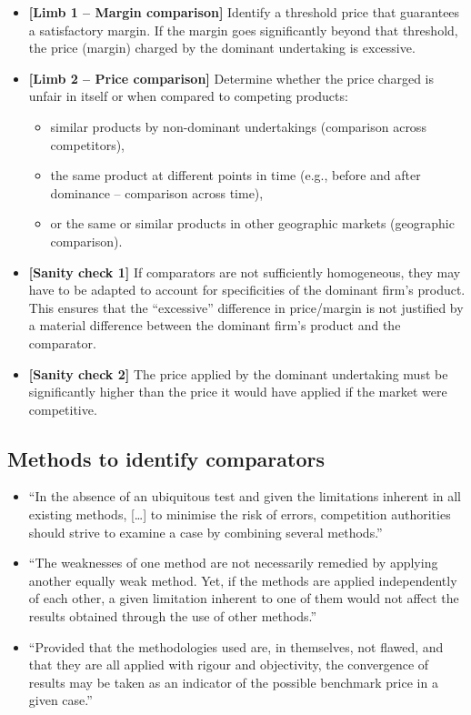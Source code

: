        \begin{itemize}
            \item \textbf{[Limb 1 – Margin comparison]} Identify a threshold price that guarantees a satisfactory margin. If the margin goes significantly beyond that threshold, the price (margin) charged by the dominant undertaking is excessive.
            \item \textbf{[Limb 2 – Price comparison]} Determine whether the price charged is unfair in itself or when compared to competing products:
            \begin{itemize}
                \item similar products by non-dominant undertakings (comparison across competitors),
                \item the same product at different points in time (e.g., before and after dominance – comparison across time),
                \item or the same or similar products in other geographic markets (geographic comparison).
            \end{itemize}
            \item \textbf{[Sanity check 1]} If comparators are not sufficiently homogeneous, they may have to be adapted to account for specificities of the dominant firm’s product. This ensures that the “excessive” difference in price/margin is not justified by a material difference between the dominant firm’s product and the comparator.
            \item \textbf{[Sanity check 2]} The price applied by the dominant undertaking must be significantly higher than the price it would have applied if the market were competitive.
        \end{itemize}

    \subsection{Methods to identify comparators}

        \begin{itemize}
            \item “In the absence of an ubiquitous test and given the limitations inherent in all existing methods, […] to minimise the risk of errors, competition authorities should strive to examine a case by combining several methods.”
            \item “The weaknesses of one method are not necessarily remedied by applying another equally weak method. Yet, if the methods are applied independently of each other, a given limitation inherent to one of them would not affect the results obtained through the use of other methods.”
            \item “Provided that the methodologies used are, in themselves, not flawed, and that they are all applied with rigour and objectivity, the convergence of results may be taken as an indicator of the possible benchmark price in a given case.”
        \end{itemize}

